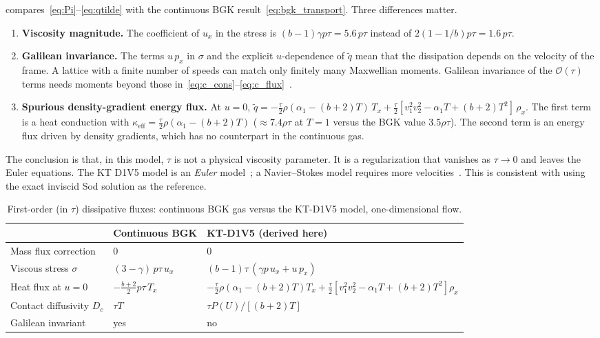 \documentclass[11pt]{article}
\theoremstyle{remark}
\newcommand{\ord}{\mathcal{O}}
\begin{document}
 compares~\eqref{eq:Pi}--\eqref{eq:qtilde} with the continuous
BGK result~\eqref{eq:bgk_transport}.  Three differences matter.
\begin{enumerate}
  \item \textbf{Viscosity magnitude.}  The coefficient of $u_x$ in the stress is
        $(b-1)\gamma p\tau = 5.6\,p\tau$ instead of $2(1-1/b)p\tau = 1.6\,p\tau$.
  \item \textbf{Galilean invariance.}  The terms $u\,p_x$ in $\sigma$ and the
        explicit $u$-dependence of $\tilde q$ mean that the dissipation depends on
        the velocity of the frame.  A lattice with a finite number of speeds can
        match only finitely many Maxwellian moments.  Galilean invariance of the
        $\ord(\tau)$ terms needs moments beyond those
        in~\eqref{eq:c_cons}--\eqref{eq:c_flux}~\citep{Shan2006}.
  \item \textbf{Spurious density-gradient energy flux.}  At $u=0$,
        $\tilde q = -\tfrac{\tau}{2}\rho(\alpha_1-(b+2)T)\,T_x + \tfrac{\tau}{2}[v_1^2v_2^2 - \alpha_1T + (b+2)T^2]\,\rho_x$.
        The first term is a heat conduction with
        $\kappa_{\mathrm{eff}} = \tfrac{\tau}{2}\rho(\alpha_1 - (b+2)T)$
        ($\approx 7.4\rho\tau$ at $T=1$ versus the BGK value $3.5\rho\tau$).
        The second term is an energy flux driven by density gradients, which has no
        counterpart in the continuous gas.
\end{enumerate}
The conclusion is that, in this model, $\tau$ is not a physical viscosity
parameter.  It is a regularization that vanishes as $\tau\to0$ and leaves the Euler
equations.  The KT D1V5 model is an \emph{Euler} model~\citep{KataokaTsutahara2004Euler};
a Navier--Stokes model requires more velocities~\citep{KataokaTsutahara2004NS}.
This is consistent with using the exact inviscid Sod solution as the reference.

\begin{table}[ht]
\centering
\caption{First-order (in $\tau$) dissipative fluxes: continuous BGK gas versus the
KT-D1V5 model, one-dimensional flow.}
\label{tab:ce_compare}
\small
\renewcommand{\arraystretch}{1.25}
\begin{tabular}{@{}lll@{}}
\toprule
 & Continuous BGK & KT-D1V5 (derived here) \\
\midrule
Mass flux correction & $0$ & $0$ \\
Viscous stress $\sigma$ & $(3-\gamma)\,p\tau\,u_x$ & $(b-1)\tau\,(\gamma p\,u_x + u\,p_x)$ \\
Heat flux at $u=0$ & $-\frac{b+2}{2}p\tau\,T_x$ & $-\frac{\tau}{2}\rho(\alpha_1-(b+2)T)T_x + \frac{\tau}{2}[v_1^2v_2^2-\alpha_1T+(b+2)T^2]\rho_x$ \\
Contact diffusivity $D_c$ & $\tau T$ & $\tau P(U)/[(b+2)T]$ \\
Galilean invariant & yes & no \\
\bottomrule
\end{tabular}
\end{table}
\end{document}
